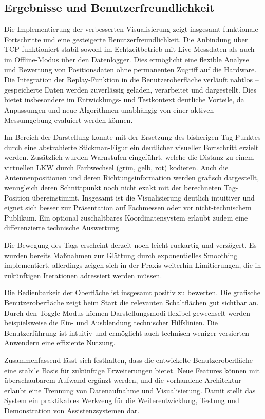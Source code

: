 \documentclass[a4paper, 12pt]{article} %
\begin{document}
\subsection{Ergebnisse und Benutzerfreundlichkeit}

Die Implementierung der verbesserten Visualisierung zeigt insgesamt funktionale Fortschritte und eine gesteigerte Benutzerfreundlichkeit. Die Anbindung 
über TCP funktioniert stabil sowohl im Echtzeitbetrieb mit Live-Messdaten als auch im Offline-Modus über den Datenlogger. Dies ermöglicht eine flexible 
Analyse und Bewertung von Positionsdaten ohne permanenten Zugriff auf die Hardware. Die Integration der Replay-Funktion in die Benutzeroberfläche verläuft
 nahtlos – gespeicherte Daten werden zuverlässig geladen, verarbeitet und dargestellt. Dies bietet insbesondere im Entwicklungs- und Testkontext deutliche
  Vorteile, da Anpassungen und neue Algorithmen unabhängig von einer aktiven Messumgebung evaluiert werden können.

Im Bereich der Darstellung konnte mit der Ersetzung des bisherigen Tag-Punktes durch eine abstrahierte Stickman-Figur ein deutlicher visueller 
Fortschritt erzielt werden. Zusätzlich wurden Warnstufen eingeführt, welche die Distanz zu einem virtuellen \ac{LKW} durch Farbwechsel (grün, gelb, rot) 
kodieren. Auch die Antennenpositionen und deren Richtungsinformation werden grafisch dargestellt, wenngleich deren Schnittpunkt noch nicht exakt mit der 
berechneten Tag-Position übereinstimmt. Insgesamt ist die Visualisierung deutlich intuitiver und eignet sich besser zur Präsentation auf Fachmessen oder
 vor nicht-technischem Publikum. Ein optional zuschaltbares Koordinatensystem erlaubt zudem eine differenzierte technische Auswertung.

Die Bewegung des Tags erscheint derzeit noch leicht ruckartig und verzögert. Es wurden bereits Maßnahmen zur Glättung durch exponentielles Smoothing 
implementiert, allerdings zeigen sich in der Praxis weiterhin Limitierungen, die in zukünftigen Iterationen adressiert werden müssen.

Die Bedienbarkeit der Oberfläche ist insgesamt positiv zu bewerten. Die grafische Benutzeroberfläche zeigt beim Start die relevanten Schaltflächen gut 
sichtbar an. Durch den Toggle-Modus können Darstellungsmodi flexibel gewechselt werden – beispielsweise die Ein- und Ausblendung technischer Hilfslinien. 
Die Benutzerführung ist intuitiv und ermöglicht auch technisch weniger versierten Anwendern eine effiziente Nutzung.

Zusammenfassend lässt sich festhalten, dass die entwickelte Benutzeroberfläche eine stabile Basis für zukünftige Erweiterungen bietet. Neue Features 
können mit überschaubarem Aufwand ergänzt werden, und die vorhandene Architektur erlaubt eine Trennung von Datenaufnahme und Visualisierung. Damit stellt
 das System ein praktikables Werkzeug für die Weiterentwicklung, Testung und Demonstration von Assistenzsystemen dar.
\end{document}
